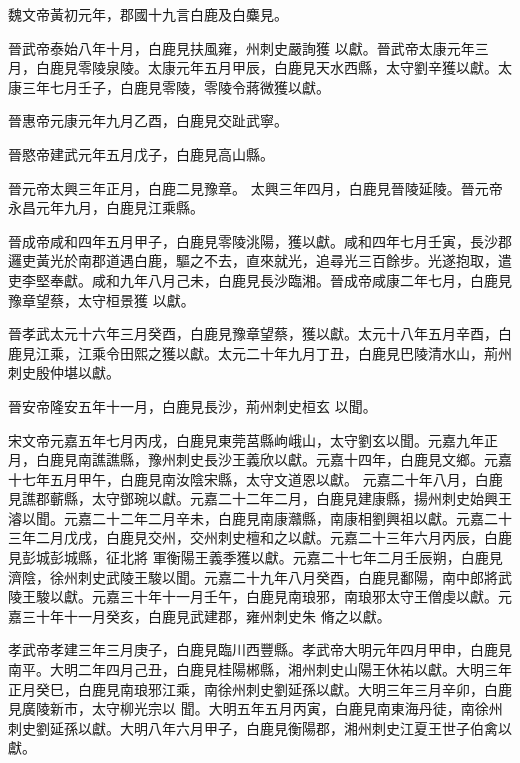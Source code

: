 \begin{pinyinscope}
 魏文帝黃初元年，郡國十九言白鹿及白麋見。



 晉武帝泰始八年十月，白鹿見扶風雍，州刺史嚴詢獲
 以獻。晉武帝太康元年三月，白鹿見零陵泉陵。太康元年五月甲辰，白鹿見天水西縣，太守劉辛獲以獻。太康三年七月壬子，白鹿見零陵，零陵令蔣微獲以獻。



 晉惠帝元康元年九月乙酉，白鹿見交趾武寧。



 晉愍帝建武元年五月戊子，白鹿見高山縣。



 晉元帝太興三年正月，白鹿二見豫章。
 太興三年四月，白鹿見晉陵延陵。晉元帝永昌元年九月，白鹿見江乘縣。



 晉成帝咸和四年五月甲子，白鹿見零陵洮陽，獲以獻。咸和四年七月壬寅，長沙郡邏吏黃光於南郡道遇白鹿，驅之不去，直來就光，追尋光三百餘步。光遂抱取，遣吏李堅奉獻。咸和九年八月己未，白鹿見長沙臨湘。晉成帝咸康二年七月，白鹿見豫章望蔡，太守桓景獲
 以獻。



 晉孝武太元十六年三月癸酉，白鹿見豫章望蔡，獲以獻。太元十八年五月辛酉，白鹿見江乘，江乘令田熙之獲以獻。太元二十年九月丁丑，白鹿見巴陵清水山，荊州刺史殷仲堪以獻。



 晉安帝隆安五年十一月，白鹿見長沙，荊州刺史桓玄
 以聞。



 宋文帝元嘉五年七月丙戌，白鹿見東莞莒縣岣峨山，太守劉玄以聞。元嘉九年正月，白鹿見南譙譙縣，豫州刺史長沙王義欣以獻。元嘉十四年，白鹿見文鄉。元嘉十七年五月甲午，白鹿見南汝陰宋縣，太守文道恩以獻。
 元嘉二十年八月，白鹿見譙郡蘄縣，太守鄧琬以獻。元嘉二十二年二月，白鹿見建康縣，揚州刺史始興王濬以聞。元嘉二十二年二月辛未，白鹿見南康灨縣，南康相劉興祖以獻。元嘉二十三年二月戊戌，白鹿見交州，交州刺史檀和之以獻。元嘉二十三年六月丙辰，白鹿見彭城彭城縣，征北將
 軍衡陽王義季獲以獻。元嘉二十七年二月壬辰朔，白鹿見濟陰，徐州刺史武陵王駿以聞。元嘉二十九年八月癸酉，白鹿見鄱陽，南中郎將武陵王駿以獻。元嘉三十年十一月壬午，白鹿見南琅邪，南琅邪太守王僧虔以獻。元嘉三十年十一月癸亥，白鹿見武建郡，雍州刺史朱
 脩之以獻。



 孝武帝孝建三年三月庚子，白鹿見臨川西豐縣。孝武帝大明元年四月甲申，白鹿見南平。大明二年四月己丑，白鹿見桂陽郴縣，湘州刺史山陽王休祐以獻。大明三年正月癸巳，白鹿見南琅邪江乘，南徐州刺史劉延孫以獻。大明三年三月辛卯，白鹿見廣陵新市，太守柳光宗以
 聞。大明五年五月丙寅，白鹿見南東海丹徒，南徐州刺史劉延孫以獻。大明八年六月甲子，白鹿見衡陽郡，湘州刺史江夏王世子伯禽以獻。




\end{pinyinscope}
